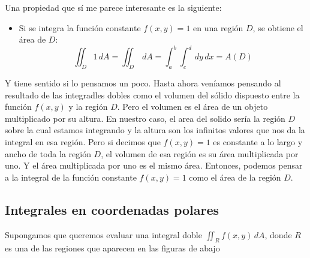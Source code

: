 \documentclass[12pt]{article}
\begin{document}
Una propiedad que sí me parece interesante es la siguiente:
\begin{itemize}
  \item Si se integra la función constante $ f(x,y)=1 $ en una región $ D $, se obtiene el área de $ D $:
	  \[
	    \iint_{D} 1 \,dA = \iint_{D}  \,dA = \int_{a}^{b} \int_{c}^{d}  \,dy\,dx = A(D)
	  \]
\end{itemize}

Y tiene sentido si lo pensamos un poco. Hasta ahora veníamos pensando al resultado de las integradles dobles como el volumen del sólido dispuesto entre la función $ f(x,y) $ y la región $ D $. Pero el volumen es el área de un objeto multiplicado por su altura. En nuestro caso, el area del solido sería la región $ D $ sobre la cual estamos integrando y la altura son los infinitos valores que nos da la integral en esa región. Pero si decimos que $ f(x,y)=1 $ es constante a lo largo y ancho de toda la región $ D $, el volumen de esa región es su área multiplicada por uno. Y el área multiplicada por uno es el mismo área. Entonces, podemos pensar a la integral de la función constante $ f(x,y)=1 $ como el área de la región $ D $.

\subsection{Integrales en coordenadas polares}
Supongamos que queremos evaluar una integral doble $ \iint_{R} f(x,y) \,dA $, donde $ R $ es una de las regiones que aparecen en las figuras de abajo
\end{document}
